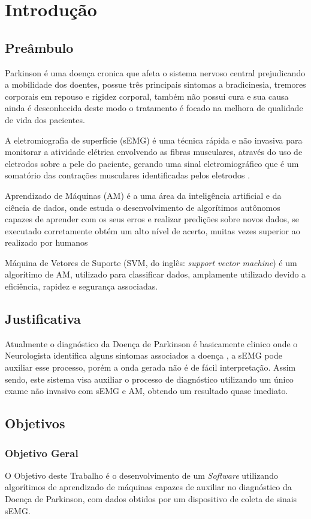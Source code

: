 \chapter*[Introdução]{Introdução}
\section{Preâmbulo}
Parkinson é uma doença cronica que afeta o sistema nervoso central prejudicando a mobilidade dos doentes, possue três principais sintomas a bradicinesia, tremores corporais em repouso e rigidez corporal, também não possui cura e sua causa ainda é desconhecida deste modo o tratamento é focado na melhora de qualidade de vida dos pacientes\cite{da2016aspectos}.

A eletromiografia de superfície (sEMG) é uma técnica rápida e não invasiva para monitorar a atividade elétrica envolvendo as fibras musculares, através do uso de eletrodos sobre a pele do paciente, gerando uma sinal eletromiográfico que é um somatório das contrações musculares identificadas pelos eletrodos \cite{de2010eletromiografia}.

Aprendizado de Máquinas (AM) é a uma área da inteligência artificial e da ciência de dados, onde estuda o desenvolvimento de algorítimos autônomos capazes de aprender com os seus erros e realizar predições sobre novos dados, se executado corretamente obtém um alto nível de acerto, muitas vezes superior ao realizado por humanos \cite{Kohavi}

Máquina de Vetores de Suporte (SVM, do inglês: \textit{support vector machine}) é um algorítimo de AM, utilizado para classificar dados, amplamente utilizado devido a eficiência, rapidez e segurança associadas.

\section{Justificativa}
Atualmente o diagnóstico da Doença de Parkinson é basicamente clinico onde o Neurologista identifica alguns sintomas associados a doença \cite{gago2014manual}, a sEMG pode auxiliar esse processo, porém a onda gerada não é de fácil interpretação. Assim sendo, este sistema visa auxiliar o processo de diagnóstico utilizando um único exame não invasivo com sEMG e AM, obtendo um resultado quase imediato.

\section{Objetivos}
\subsection{Objetivo Geral}
O Objetivo deste Trabalho é o desenvolvimento de um \textit{Software} utilizando algorítimos de aprendizado de máquinas capazes de auxiliar no diagnóstico da Doença de Parkinson, com dados obtidos por um dispositivo de coleta de sinais sEMG.

